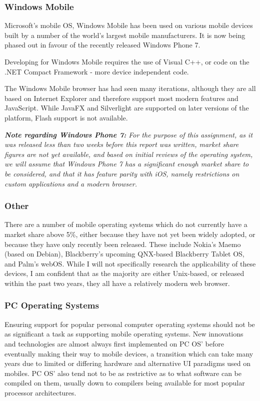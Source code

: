\documentclass[a4papert,11pt,notitlepage]{ltxdoc}
\begin{document}
\subsubsection{Windows Mobile}
Microsoft's mobile OS, Windows Mobile has been used on various mobile devices built by a number of the world's largest mobile manufacturers. It is now being phased out in favour of the recently released Windows Phone 7.

Developing for Windows Mobile requires the use of Visual C++, or code on the .NET Compact Framework - more device independent code.

The Windows Mobile browser has had seen many iterations, although they are all based on Internet Explorer and therefore support most modern features and JavaScript. While JavaFX and Silverlight are supported on later versions of the platform, Flash support is not available.

{\it{\bf Note regarding Windows Phone 7:} For the purpose of this assignment, as it was released less than two weeks before this report was written, market share figures are not yet available, and based on initial reviews of the operating system, we will assume that Windows Phone 7 has a significant enough market share to be considered, and that it has feature parity with iOS, namely restrictions on custom applications and a modern browser.}

\subsubsection{Other}
There are a number of mobile operating systems which do not currently have a market share above 5\%, either because they have not yet been widely adopted, or because they have only recently been released. These include Nokia's Maemo (based on Debian), Blackberry's upcoming QNX-based Blackberry Tablet OS, and Palm's webOS. While I will not specifically research the applicability of these devices, I am confident that as the majority are either Unix-based, or released within the past two years, they all have a relatively modern web browser.

\subsubsection{PC Operating Systems}
Ensuring support for popular personal computer operating systems should not be as significant a task as supporting mobile operating systems. New innovations and technologies are almost always first implemented on PC OS' before eventually making their way to mobile devices, a transition which can take many years due to limited or differing hardware and alternative UI paradigms used on mobiles. PC OS' also tend not to be as restrictive as to what software can be compiled on them, usually down to compilers being available for most popular processor architectures.
\end{document}
